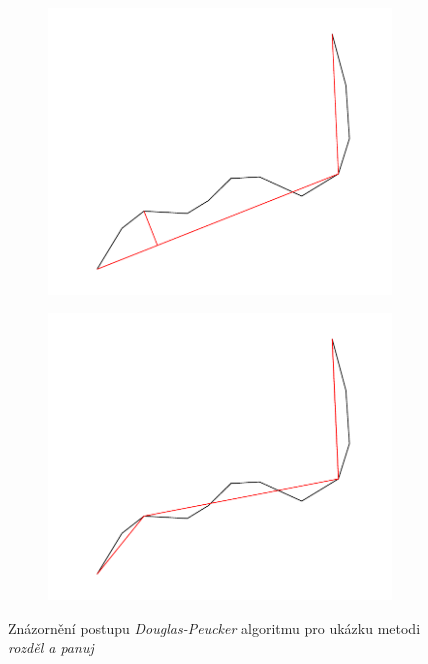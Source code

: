\begin{figure}[h]
\begin{subfigure}{0.5\textwidth}
  \includegraphics[width=\linewidth]{./pictures/4/douglas-peucker_3.pdf}
  \label{fig:3-douglas-peucker_3}
\end{subfigure}\hfil %
\begin{subfigure}{0.5\textwidth}
  \includegraphics[width=\linewidth]{./pictures/4/douglas-peucker_4.pdf}
  \label{fig:3-douglas-peucker_4}
\end{subfigure}\hfil %
\caption{Znázornění postupu \textit{Douglas-Peucker} algoritmu pro ukázku metodi \textit{rozděl a panuj}}
\end{figure}
	

